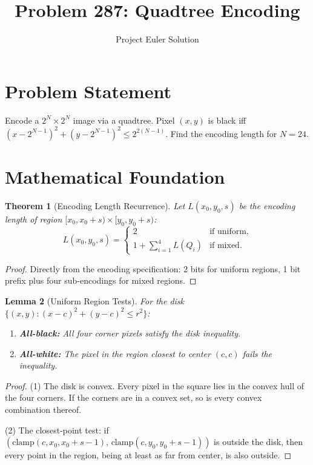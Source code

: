 \documentclass[12pt]{article}
\title{Problem 287: Quadtree Encoding}
\author{Project Euler Solution}
\date{}
\newtheorem{theorem}{Theorem}
\newtheorem{lemma}[theorem]{Lemma}
\begin{document}
\maketitle

\section{Problem Statement}

Encode a $2^N \times 2^N$ image via a quadtree. Pixel $(x,y)$ is black iff $(x - 2^{N-1})^2 + (y - 2^{N-1})^2 \le 2^{2(N-1)}$. Find the encoding length for $N = 24$.

\section{Mathematical Foundation}

\begin{theorem}[Encoding Length Recurrence]
Let $L(x_0, y_0, s)$ be the encoding length of region $[x_0, x_0+s) \times [y_0, y_0+s)$:
\[
L(x_0, y_0, s) = \begin{cases} 2 & \text{if uniform,} \\ 1 + \sum_{i=1}^{4} L(Q_i) & \text{if mixed.} \end{cases}
\]
\end{theorem}

\begin{proof}
Directly from the encoding specification: 2 bits for uniform regions, 1 bit prefix plus four sub-encodings for mixed regions.
\end{proof}

\begin{lemma}[Uniform Region Tests]
For the disk $\{(x,y): (x-c)^2+(y-c)^2 \le r^2\}$:
\begin{enumerate}
\item \textbf{All-black:} All four corner pixels satisfy the disk inequality.
\item \textbf{All-white:} The pixel in the region closest to center $(c,c)$ fails the inequality.
\end{enumerate}
\end{lemma}

\begin{proof}
(1) The disk is convex. Every pixel in the square lies in the convex hull of the four corners. If the corners are in a convex set, so is every convex combination thereof.

(2) The closest-point test: if $(\mathrm{clamp}(c, x_0, x_0\!+\!s\!-\!1),\, \mathrm{clamp}(c, y_0, y_0\!+\!s\!-\!1))$ is outside the disk, then every point in the region, being at least as far from center, is also outside.
\end{proof}
\end{document}
